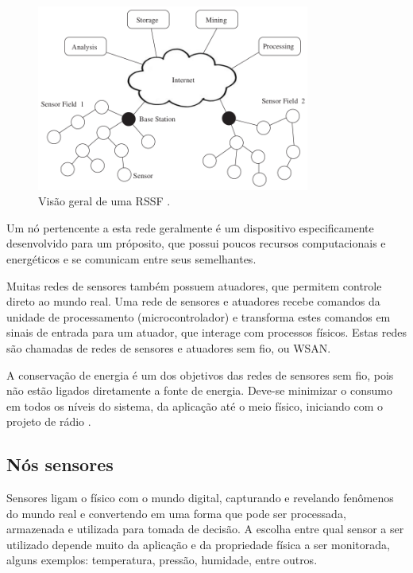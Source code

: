 \begin{figure}[H]
   \label{wsnOverview}
   \centering
   \includegraphics[width=0.8\textwidth]{figuras/wsn.png}
   \caption{Vis\~ao geral de uma RSSF \cite{dargie2010fundamentals}.}
\end{figure}

Um n\'o pertencente a esta rede geralmente \'e um dispositivo especificamente desenvolvido para um pr\'oposito, que possui poucos recursos computacionais e energ\'eticos e se comunicam entre seus semelhantes.

Muitas redes de sensores tamb\'em possuem atuadores, que permitem controle direto ao mundo real. Uma rede de sensores e atuadores recebe comandos da unidade de processamento (microcontrolador) e transforma estes comandos em sinais de entrada para um atuador, que interage com processos f\'isicos. Estas redes s\~ao chamadas de redes de sensores e atuadores sem fio, ou WSAN.

A conserva\c{c}\~ao de energia \'e um dos objetivos das redes de sensores sem fio, pois n\~ao est\~ao ligados diretamente a fonte de energia. Deve-se minimizar o consumo em todos os n\'iveis do sistema, da aplica\c{c}\~ao at\'e o meio f\'isico, iniciando com o projeto de r\'adio \cite{WsnSurvey2008}.

\subsection{N\'os sensores}
Sensores ligam o f\'isico com o mundo digital, capturando e revelando fen\^omenos do mundo real e convertendo em uma forma que pode ser processada, armazenada e utilizada para tomada de decis\~ao. A escolha entre qual sensor a ser utilizado depende muito da aplica\c{c}\~ao e da propriedade f\'isica a ser monitorada, alguns exemplos: temperatura, press\~ao, humidade, entre outros.

